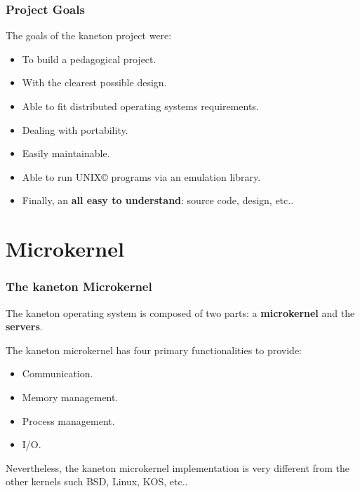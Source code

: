 \begin{frame}
  \frametitle{Project Goals}

  The goals of the kaneton project were:

  \begin{itemize}[<+->]
    \item
      To build a pedagogical project.
    \item
      With the clearest possible design.
    \item
      Able to fit distributed operating systems requirements.
    \item
      Dealing with portability.
    \item
      Easily maintainable.
    \item
      Able to run UNIX{\scriptsize \copyright} programs via
      an emulation library.
    \item
      Finally, an \textbf{all easy to understand}: source code, design,
      etc..
  \end{itemize}
\end{frame}

%
%

\section{Microkernel}


\begin{frame}
  \frametitle{The kaneton Microkernel}

  The kaneton operating system is composed of two parts: a
  \textbf{microkernel} and the \textbf{servers}.

  \nl

  The kaneton microkernel has four primary functionalities
  to provide:

  \begin{itemize}[<+->]
    \item
      Communication.
    \item
      Memory management.
    \item
      Process management.
    \item
      I/O.
  \end{itemize}

  \nl

  Nevertheless, the kaneton microkernel implementation is very different
  from the other kernels such BSD, Linux, KOS, etc..
\end{frame}

